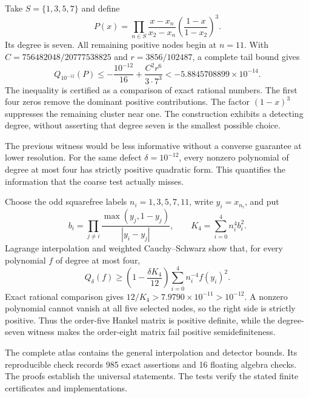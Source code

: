 Take $S=\{1,3,5,7\}$ and define
\[
P(x)=\prod_{n\in S}\frac{x-x_n}{x_2-x_n}
 \left(\frac{1-x}{1-x_2}\right)^3.
\]
Its degree is seven. All remaining positive nodes begin at $n=11$.
With
$C=756482048/20777538825$ and $r=3856/102487$, a complete tail bound gives
\[
Q_{10^{-12}}(P)\le-\frac{10^{-12}}{16}
 +\frac{C^2r^6}{3\cdot7^3}
 <-5.8845708899\times10^{-14}.
\]
The inequality is certified as a comparison of exact rational numbers.
The first four zeros remove the dominant positive contributions.
The factor $(1-x)^3$ suppresses the remaining cluster near one.
The construction exhibits a detecting degree, without asserting that degree
seven is the smallest possible choice.

The previous witness would be less informative without a converse guarantee
at lower resolution. For the same defect $\delta=10^{-12}$, every nonzero
polynomial of degree at most four has strictly positive quadratic form. This quantifies
the information that the coarse test actually misses.


Choose the odd squarefree labels $n_i=1,3,5,7,11$, write $y_i=x_{n_i}$,
and put
\[
b_i=\prod_{j\ne i}\frac{\max(y_j,1-y_j)}{|y_i-y_j|},
\qquad K_4=\sum_{i=0}^{4}n_i^4b_i^2.
\]
Lagrange interpolation and weighted Cauchy--Schwarz show that, for every
polynomial $f$ of degree at most four,
\[
Q_\delta(f)\ge
\left(1-\frac{\delta K_4}{12}\right)
\sum_{i=0}^{4}n_i^{-4}f(y_i)^2.
\]
Exact rational comparison gives $12/K_4>7.9790\times10^{-11}>10^{-12}$.
A nonzero polynomial cannot vanish at all five selected nodes, so the right
side is strictly positive. Thus the order-five Hankel matrix is positive
definite, while the degree-seven witness makes the order-eight matrix fail
positive semidefiniteness.

The complete atlas contains the general interpolation and detector bounds.
Its reproducible check records 985 exact assertions and 16 floating algebra
checks. The proofs establish the universal statements. The tests verify the
stated finite certificates and implementations.
